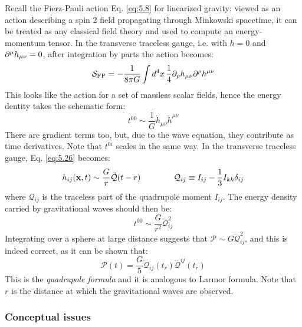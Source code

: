 Recall the Fierz-Pauli action Eq. \ref{eq:5.8} for linearized gravity: viewed as an action describing a spin 2 field propagating through Minkowski spacetime, it can be treated as any classical field theory and used to compute an energy-momentum tensor. In the transverse traceless gauge, i.e. with $ h = 0 $ and $ \partial^\mu h_{\mu \nu} = 0 $, after integration by parts the action becomes:
\begin{equation*}
  \mathcal{S}_{\text{FP}} = - \frac{1}{8\pi G} \int d^4 x\, \frac{1}{4} \partial_\rho h_{\mu \nu} \partial^\rho h^{\mu \nu}
\end{equation*}
This looks like the action for a set of massless scalar fields, hence the energy dentity takes the schematic form:
\begin{equation*}
  t^{00} \sim \frac{1}{G} \dot{h}_{\mu \nu} \dot{h}^{\mu \nu}
\end{equation*}
There are gradient terms too, but, due to the wave equation, they contribute as time derivatives. Note that $ t^{0i} $ scales in the same way. In the transverse traceless gauge, Eq. \ref{eq:5.26} becomes:
\begin{equation*}
  h_{ij}(\mathbf{x},t) \sim \frac{G}{r} \ddot{\mathcal{Q}}(t - r)
  \qquad \qquad
  \mathcal{Q}_{ij} \equiv I_{ij} - \frac{1}{3} I_{kk} \delta_{ij}
\end{equation*}
where $ \mathcal{Q}_{ij} $ is the traceless part of the quadrupole moment $ I_{ij} $. The energy density carried by gravitational waves should then be:
\begin{equation*}
  t^{00} \sim \frac{G}{r^2} \dddot{\mathcal{Q}}_{ij}^2
\end{equation*}
Integrating over a sphere at large distance suggests that $ \mathcal{P} \sim G \dddot{\mathcal{Q}}_{ij}^2 $, and this is indeed correct, as it can be shown that:
\begin{equation}
  \mathcal{P}(t) = \frac{G}{5} \dddot{\mathcal{Q}}_{ij}(t_r) \dddot{\mathcal{Q}}^{ij}(t_r)
  \label{eq:5.29}
\end{equation}
This is the \textit{quadrupole formula} and it is analogous to Larmor formula. Note that $ r $ is the distance at which the gravitational waves are observed.

\subsubsection{Conceptual issues}

